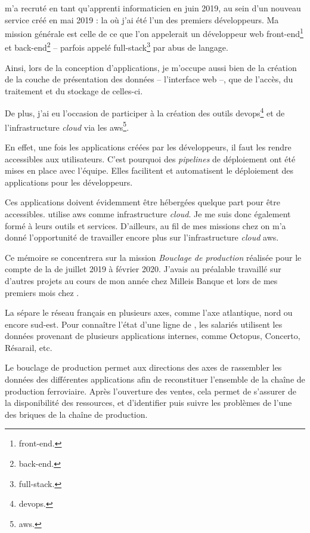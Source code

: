 \entreprise m'a recruté en tant qu'apprenti informaticien en juin 2019, au sein d'un nouveau service créé en mai 2019 : la \df où j'ai été l'un des premiers développeurs.
Ma mission générale est celle de ce que l'on appelerait un développeur web 
\gls{front-end}\footnote{\glsdesc{front-end}.}
et 
\gls{back-end}\footnote{\glsdesc{back-end}.}
-- parfois appelé 
\gls{full-stack}\footnote{\glsdesc{full-stack}.}
par abus de langage.

Ainsi, lors de la conception d'applications, je m'occupe aussi bien de la création de la couche de présentation des données -- l'interface web --, que de l'accès, du traitement et du stockage de celles-ci.

De plus, j'ai eu l'occasion de participer à la création des outils 
\gls{devops}\footnote{\glsdesc{devops}.}
et de l'infrastructure \textit{cloud} via les
\gls{aws}\footnote{\glsdesc{aws}.}.

En effet, une fois les applications créées par les développeurs, il faut les rendre accessibles aux utilisateurs. C'est pourquoi des \textit{pipelines} de déploiement ont été mises en place avec l'équipe. Elles facilitent et automatisent le déploiement des applications pour les développeurs.

Ces applications doivent évidemment être hébergées quelque part pour être accessibles. \entreprise utilise \gls{aws} comme infrastructure \textit{cloud}. Je me suis donc également formé à leurs outils et services. D'ailleurs, au fil de mes missions chez \entreprise on m'a donné l'opportunité de travailler encore plus sur l'infrastructure \textit{cloud} \gls{aws}.

\newpage{}

Ce mémoire se concentrera sur la mission \emph{Bouclage de production} réalisée pour le compte de la \sncf de juillet 2019 à février 2020. J'avais au préalable travaillé sur d'autres projets au cours de mon année chez Milleis Banque et lors de mes premiers mois chez \tnp.

La \sncf sépare le réseau \tgv français en plusieurs axes, comme l'axe atlantique, nord ou encore sud-est.
Pour connaître l'état d'une ligne de \tgv, les salariés utilisent les données provenant de plusieurs applications internes, comme Octopus, Concerto, Résarail, etc.

Le \og bouclage de production \fg permet aux directions des axes de rassembler les données des différentes applications afin de reconstituer l'ensemble de la chaîne de production ferroviaire.
Après l'ouverture des ventes, cela permet de s'assurer de la disponibilité des ressources, et d'identifier puis suivre les problèmes de l'une des briques de la chaîne de production.


